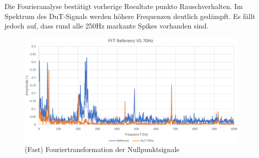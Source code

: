 \noindent Die Fourieranalyse bestätigt vorherige Resultate punkto Rauschverhalten. Im Spektrum des DuT-Signals werden höhere Frequenzen deutlich gedämpft. Es fällt jedoch auf, dass rund alle 250Hz markante Spikes vorhanden sind.
	\begin{figure}[H]
		\centering
		\includegraphics[width=1\linewidth]{img_70Hz/comp_FFT}
		\caption{(Fast) Fouriertransformation der Nullpunktsignale}
		\label{fig:compfft}
	\end{figure}
	

